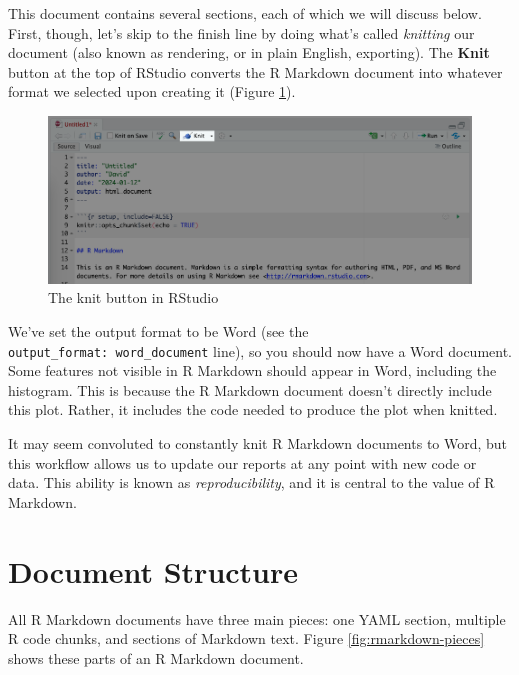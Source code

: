 \documentclass[
]{book}
\begin{document}
This document contains several sections, each of which we will discuss below. First, though, let's skip to the finish line by doing what's called \emph{knitting} our document (also known as rendering, or in plain English, exporting). The \textbf{Knit} button at the top of RStudio converts the R Markdown document into whatever format we selected upon creating it (Figure \ref{fig:knit-button}).

\begin{figure}
\includegraphics[width=1\linewidth]{assets/knit-button} \caption{The knit button in RStudio}\label{fig:knit-button}
\end{figure}

We've set the output format to be Word (see the \texttt{output\_format:\ word\_document} line), so you should now have a Word document. Some features not visible in R Markdown should appear in Word, including the histogram. This is because the R Markdown document doesn't directly include this plot. Rather, it includes the code needed to produce the plot when knitted.

It may seem convoluted to constantly knit R Markdown documents to Word, but this workflow allows us to update our reports at any point with new code or data. This ability is known as \emph{reproducibility}, and it is central to the value of R Markdown.

\hypertarget{document-structure}{%
\section*{Document Structure}\label{document-structure}}

All R Markdown documents have three main pieces: one YAML section, multiple R code chunks, and sections of Markdown text. Figure \ref{fig:rmarkdown-pieces} shows these parts of an R Markdown document.
\end{document}
